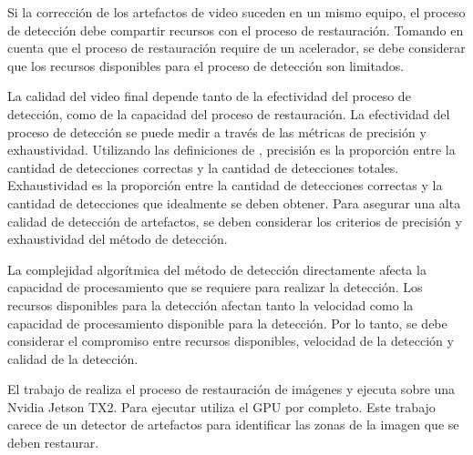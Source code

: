 Si la corrección de los artefactos de video suceden en un mismo equipo, el proceso de detección debe compartir recursos con el proceso de restauración. Tomando en cuenta que el proceso de restauración require de un acelerador, se debe considerar que los recursos disponibles para el proceso de detección son limitados.

La calidad del video final depende tanto de la efectividad del proceso de detección, como de la capacidad del proceso de restauración. La efectividad del proceso de detección se puede medir a través de las métricas de precisión y exhaustividad. Utilizando las definiciones de \cite{ScikitLearn}, precisión es la proporción entre la cantidad de detecciones correctas y la cantidad de detecciones totales. Exhaustividad es la proporción entre la cantidad de detecciones correctas y la cantidad de detecciones que idealmente se deben obtener. Para asegurar una alta calidad de detección de artefactos, se deben considerar los criterios de precisión y exhaustividad del método de detección.

La complejidad algorítmica del método de detección directamente afecta la capacidad de procesamiento que se requiere para realizar la detección. Los recursos disponibles para la detección afectan tanto la velocidad como la capacidad de procesamiento disponible para la detección. Por lo tanto, se debe considerar el compromiso entre recursos disponibles, velocidad de la detección y calidad de la detección.

El trabajo de \cite{Brenes2022} realiza el proceso de restauración de imágenes y ejecuta sobre una Nvidia Jetson TX2. Para ejecutar utiliza el GPU por completo. Este trabajo carece de un detector de artefactos para identificar las zonas de la imagen que se deben restaurar.
